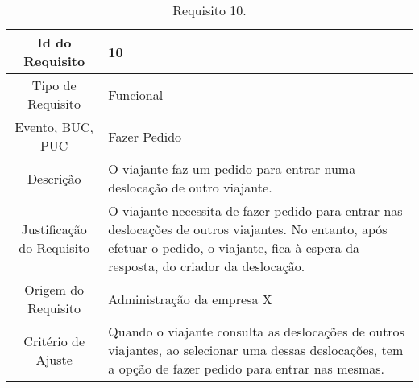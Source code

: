 \begin{table}[H]
\begin{center}
  \begin{tabularx}{\textwidth}{ | c | X | }
    \hline
    Id do Requisito & 10  \\
    
    \hline
    Tipo de Requisito & Funcional \\
    
    \hline
    Evento, BUC, PUC &  Fazer Pedido\\
    
    \hline
    Descrição & O viajante faz um pedido para entrar numa deslocação de outro viajante. \\
    
    \hline
    Justificação do Requisito & O viajante necessita de fazer pedido para entrar nas deslocações de outros viajantes. No entanto, após efetuar o pedido, o viajante, fica à espera da resposta, do criador da deslocação. \\
    
    \hline
    Origem do Requisito & Administração da empresa X \\
    
    \hline
    Critério de Ajuste & Quando o viajante consulta as deslocações de outros viajantes, ao selecionar uma dessas deslocações, tem a opção de fazer pedido para entrar nas mesmas. \\
    
    \hline
  \end{tabularx}
  \caption{Requisito 10.} \label{tab:r3}
\end{center}
\end{table}


